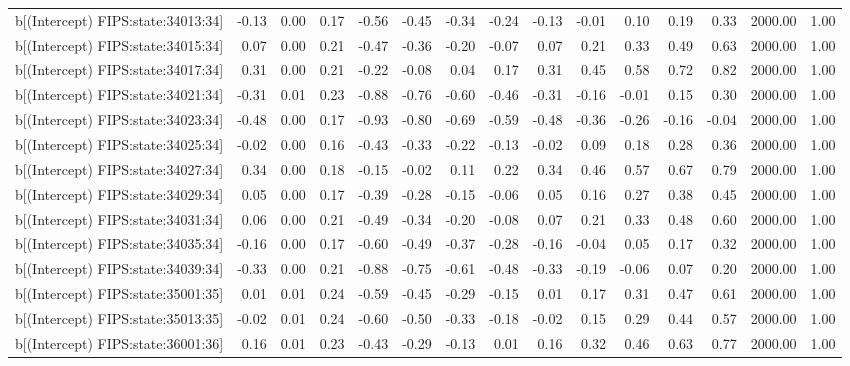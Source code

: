 \begin{table}[ht]
\begin{tabular}{rrrrrrrrrrrrrrr}
  b[(Intercept) FIPS:state:34013:34] & -0.13 & 0.00 & 0.17 & -0.56 & -0.45 & -0.34 & -0.24 & -0.13 & -0.01 & 0.10 & 0.19 & 0.33 & 2000.00 & 1.00 \\ 
  b[(Intercept) FIPS:state:34015:34] & 0.07 & 0.00 & 0.21 & -0.47 & -0.36 & -0.20 & -0.07 & 0.07 & 0.21 & 0.33 & 0.49 & 0.63 & 2000.00 & 1.00 \\ 
  b[(Intercept) FIPS:state:34017:34] & 0.31 & 0.00 & 0.21 & -0.22 & -0.08 & 0.04 & 0.17 & 0.31 & 0.45 & 0.58 & 0.72 & 0.82 & 2000.00 & 1.00 \\ 
  b[(Intercept) FIPS:state:34021:34] & -0.31 & 0.01 & 0.23 & -0.88 & -0.76 & -0.60 & -0.46 & -0.31 & -0.16 & -0.01 & 0.15 & 0.30 & 2000.00 & 1.00 \\ 
  b[(Intercept) FIPS:state:34023:34] & -0.48 & 0.00 & 0.17 & -0.93 & -0.80 & -0.69 & -0.59 & -0.48 & -0.36 & -0.26 & -0.16 & -0.04 & 2000.00 & 1.00 \\ 
  b[(Intercept) FIPS:state:34025:34] & -0.02 & 0.00 & 0.16 & -0.43 & -0.33 & -0.22 & -0.13 & -0.02 & 0.09 & 0.18 & 0.28 & 0.36 & 2000.00 & 1.00 \\ 
  b[(Intercept) FIPS:state:34027:34] & 0.34 & 0.00 & 0.18 & -0.15 & -0.02 & 0.11 & 0.22 & 0.34 & 0.46 & 0.57 & 0.67 & 0.79 & 2000.00 & 1.00 \\ 
  b[(Intercept) FIPS:state:34029:34] & 0.05 & 0.00 & 0.17 & -0.39 & -0.28 & -0.15 & -0.06 & 0.05 & 0.16 & 0.27 & 0.38 & 0.45 & 2000.00 & 1.00 \\ 
  b[(Intercept) FIPS:state:34031:34] & 0.06 & 0.00 & 0.21 & -0.49 & -0.34 & -0.20 & -0.08 & 0.07 & 0.21 & 0.33 & 0.48 & 0.60 & 2000.00 & 1.00 \\ 
  b[(Intercept) FIPS:state:34035:34] & -0.16 & 0.00 & 0.17 & -0.60 & -0.49 & -0.37 & -0.28 & -0.16 & -0.04 & 0.05 & 0.17 & 0.32 & 2000.00 & 1.00 \\ 
  b[(Intercept) FIPS:state:34039:34] & -0.33 & 0.00 & 0.21 & -0.88 & -0.75 & -0.61 & -0.48 & -0.33 & -0.19 & -0.06 & 0.07 & 0.20 & 2000.00 & 1.00 \\ 
  b[(Intercept) FIPS:state:35001:35] & 0.01 & 0.01 & 0.24 & -0.59 & -0.45 & -0.29 & -0.15 & 0.01 & 0.17 & 0.31 & 0.47 & 0.61 & 2000.00 & 1.00 \\ 
  b[(Intercept) FIPS:state:35013:35] & -0.02 & 0.01 & 0.24 & -0.60 & -0.50 & -0.33 & -0.18 & -0.02 & 0.15 & 0.29 & 0.44 & 0.57 & 2000.00 & 1.00 \\ 
  b[(Intercept) FIPS:state:36001:36] & 0.16 & 0.01 & 0.23 & -0.43 & -0.29 & -0.13 & 0.01 & 0.16 & 0.32 & 0.46 & 0.63 & 0.77 & 2000.00 & 1.00 \\ 

\end{tabular}
\end{table}
